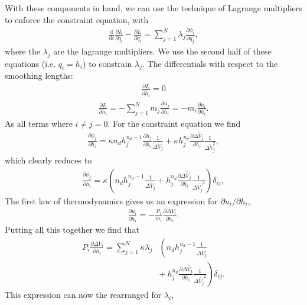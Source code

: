 With these components in hand, we can use the technique of Lagrange multipliers
to enforce the constraint equation, with
\begin{align}
  \frac{\mathrm{d}}{\mathrm{d}t} \frac{\partial L}{\partial \dot{q}_i} -
  \frac{\partial L}{\partial q_i} = 
  \sum^{N}_{j=1} \lambda_j \frac{\partial \phi_i}{\partial q_j},
  \label{eqn:sph:derivation:lmsum}
\end{align}
where the $\lambda_j$ are the lagrange multipliers.  We use the second half of
these equations (i.e. $q_i = h_i$) to constrain $\lambda_j$. The differentials
with respect to the smoothing lengths:
\begin{align}
  \frac{\partial L}{\partial \dot{h}_i} = 0
\end{align}
\begin{align}
  \frac{\partial L}{\partial h_i} =
  -\sum^N_{j=1}m_j\frac{\partial u_j}{\partial h_i} =
  -m_i \frac{\partial u_i}{\partial h_i}.
\end{align}
As all terms where $i \neq j = 0$. For the constraint equation we find
\begin{align}
  \frac{\partial \phi_j}{\partial h_i} = 
  \kappa n_d h_j^{n_d -1} \frac{\partial h_j}{\partial h_i}
    \frac{1}{\Delta \tilde{V}_j}
  + \kappa h_j^{n_d} \frac{\partial \Delta \tilde{V}_j}{\partial h_i}
    \frac{1}{\Delta \tilde{V}_j^2},
\end{align}
which clearly reduces to
\begin{align}
  \frac{\partial \phi_j}{\partial h_i} = \kappa
  \left(n_d h_j^{n_d - 1}  \frac{1}{\Delta \tilde{V_j}} +
    h_j^{n_d} \frac{\partial \Delta \tilde{V_j}}{\partial h_i}
    \frac{1}{\Delta \tilde{V_j}^2}
  \right)\delta_{ij},
\end{align}
The first law of thermodynamics gives us an expression for
${\partial u_i}/{\partial h_i}$,
\begin{align}
  \frac{\partial u_i}{\partial h_i} =
  -\frac{P_i}{m_i} \frac{\partial \Delta V_i}{\partial h_i}.
\end{align}
Putting all this together we find that
\begin{align}
  P_i \frac{\partial \Delta V_i}{\partial h_i} = 
  \sum^N_{j=1} \kappa \lambda_j
    & \left( n_d h_j^{n_d -1}  \frac{1}{\Delta \tilde{V_j}}\right. \nonumber\\
    & \left. + ~  h_j^{n_d} \frac{\partial \Delta \tilde{V_j}}{\partial h_i}
      \frac{1}{\Delta \tilde{V_j}^2}
  \right)\delta_{ij}.
\end{align}
This expression can now the rearranged for $\lambda_i$,
